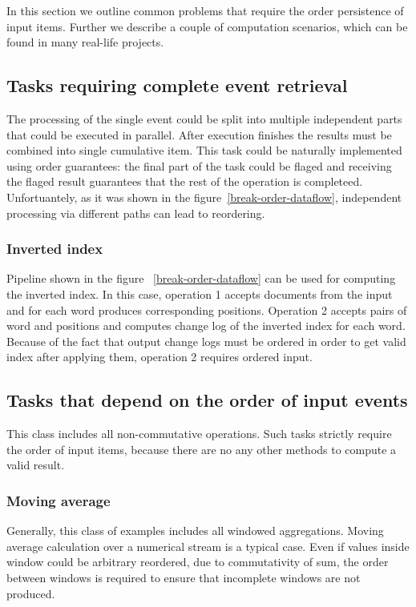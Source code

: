 
\label {fs-tasks}

In this section we outline common problems that require the order persistence of input items. Further we describe a couple of computation scenarios, which can be found in many real-life projects.

\subsection{Tasks requiring complete event retrieval}
The processing of the single event could be split into multiple independent parts that could be executed in parallel. After execution finishes the results must be combined into single cumulative item. This task could be naturally implemented using order guarantees: the final part of the task could be flaged and receiving the flaged result guarantees that the rest of the operation is completeed. Unfortuantely, as it was shown in the figure~\ref{break-order-dataflow}, independent processing via different paths can lead to reordering.

\subsubsection{Inverted index}
Pipeline shown in the figure ~\ref{break-order-dataflow} can be used for computing the inverted index. In this case, operation 1 accepts documents from the input and for each word produces corresponding positions. Operation 2 accepts pairs of word and positions and computes change log of the inverted index for each word. Because of the fact that output change logs must be ordered in order to get valid index after applying them, operation 2 requires ordered input. 

\subsection{Tasks that depend on the order of input events}
This class includes all non-commutative operations. Such tasks strictly require the order of input items, because there are no any other methods to compute a valid result.

\subsubsection{Moving average}
Generally, this class of examples includes all windowed aggregations. Moving average calculation over a numerical stream is a typical case. Even if values inside window could be arbitrary reordered, due to commutativity of sum, the order between windows is required to ensure that incomplete windows are not produced.


